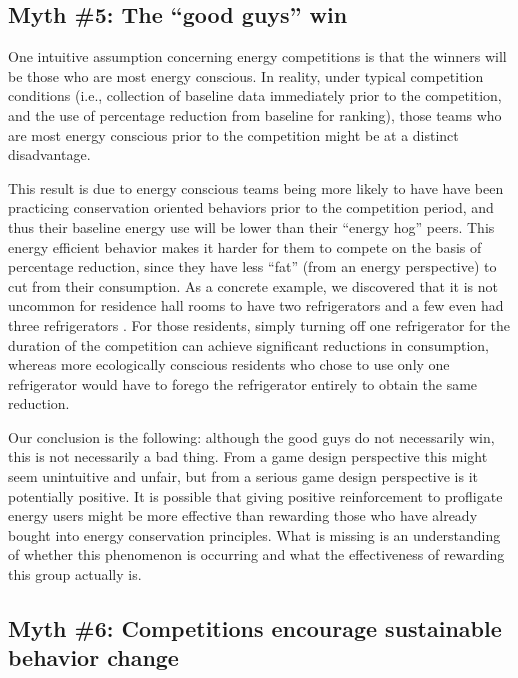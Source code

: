 \documentclass[jou]{apa} %
\begin{document}
\subsection{Myth \#5: The ``good guys'' win}

One intuitive assumption concerning energy competitions is that the winners will be those
who are most energy conscious.  In reality, under typical competition conditions
(i.e., collection of baseline data immediately prior to the competition, and the use of
percentage reduction from baseline for ranking), those teams who are most energy conscious
prior to the competition might be at a distinct disadvantage.

This result is due to energy conscious teams being more likely to have have
been practicing conservation oriented behaviors prior to the competition
period, and thus their baseline energy use will be lower than their ``energy
hog'' peers. This energy efficient behavior makes it harder for them to compete
on the basis of percentage reduction, since they have less ``fat'' (from an
energy perspective) to cut from their consumption.  As a concrete example, we
discovered that it is not uncommon for residence hall rooms to have two
refrigerators and a few even had three refrigerators \cite{csdl2-11-12}. For
those residents, simply turning off one refrigerator for the duration of the
competition can achieve significant reductions in consumption, whereas more
ecologically conscious residents who chose to use only one refrigerator would
have to forego the refrigerator entirely to obtain the same reduction.

Our conclusion is the following: although the good guys do not necessarily win, this is
not necessarily a bad thing. From a game design perspective this might seem unintuitive
and unfair, but from a serious game design perspective is it potentially positive. It is
possible that giving positive reinforcement to profligate energy users might be more effective
than rewarding those who have already bought into energy conservation principles. What is
missing is an understanding of whether this phenomenon is occurring and what the
effectiveness of rewarding this group actually is.

\subsection{Myth \#6: Competitions encourage sustainable behavior change}

\end{document}
